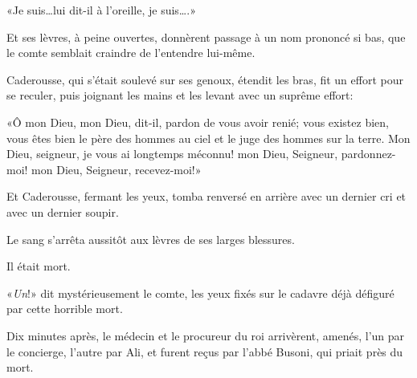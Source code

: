 «Je suis\dots lui dit-il à l'oreille, je suis\dots.» 

Et ses lèvres, à peine ouvertes, donnèrent passage à un nom prononcé si bas, que le comte semblait craindre de l'entendre lui-même. 

Caderousse, qui s'était soulevé sur ses genoux, étendit les bras, fit un effort pour se reculer, puis joignant les mains et les levant avec un suprême effort: 

«Ô mon Dieu, mon Dieu, dit-il, pardon de vous avoir renié; vous existez bien, vous êtes bien le père des hommes au ciel et le juge des hommes sur la terre. Mon Dieu, seigneur, je vous ai longtemps méconnu! mon Dieu, Seigneur, pardonnez-moi! mon Dieu, Seigneur, recevez-moi!» 

Et Caderousse, fermant les yeux, tomba renversé en arrière avec un dernier cri et avec un dernier soupir. 

Le sang s'arrêta aussitôt aux lèvres de ses larges blessures. 

Il était mort. 

«\textit{Un}!» dit mystérieusement le comte, les yeux fixés sur le cadavre déjà défiguré par cette horrible mort. 

Dix minutes après, le médecin et le procureur du roi arrivèrent, amenés, l'un par le concierge, l'autre par Ali, et furent reçus par l'abbé Busoni, qui priait près du mort. 